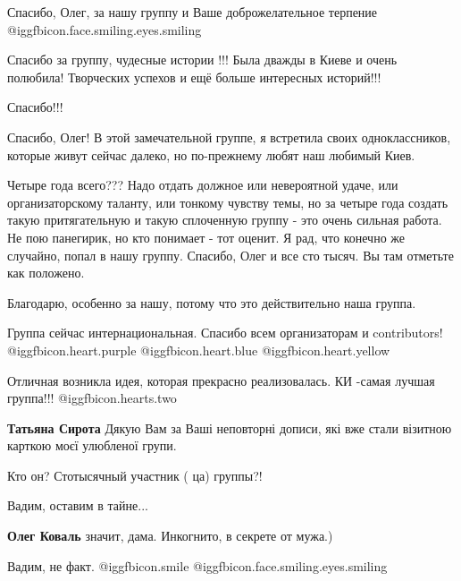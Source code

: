 \begin{itemize}
Спасибо, Олег, за нашу группу и Ваше доброжелательное терпение  @igg{fbicon.face.smiling.eyes.smiling} 

Спасибо за группу, чудесные истории !!! Была дважды в Киеве и очень полюбила!
Творческих успехов и ещё больше интересных историй!!!

Спасибо!!!


Спасибо, Олег! В этой замечательной группе, я встретила своих одноклассников,
которые живут сейчас далеко, но по-прежнему любят наш любимый Киев.


Четыре года всего??? Надо отдать должное или невероятной удаче, или
организаторскому таланту, или тонкому чувству темы, но за четыре года создать
такую притягательную и такую сплоченную группу - это очень сильная работа. Не
пою панегирик, но кто понимает - тот оценит. Я рад, что конечно же случайно,
попал в нашу группу. Спасибо, Олег и все сто тысяч. Вы там отметьте как
положено.

\begin{itemize} %
Благодарю, особенно за нашу, потому что это действительно наша группа.
\end{itemize} %

Группа сейчас интернациональная. Спасибо всем организаторам и contributors!  @igg{fbicon.heart.purple}  @igg{fbicon.heart.blue}  @igg{fbicon.heart.yellow} 


Отличная возникла идея, которая прекрасно реализовалась.
КИ -самая лучшая группа!!! @igg{fbicon.hearts.two} 

\begin{itemize} %
\textbf{Татьяна Сирота} Дякую Вам за Ваші неповторні дописи, які вже стали візитною карткою моєї улюбленої групи.
\end{itemize} %

Кто он? Стотысячный участник ( ца) группы?!

\begin{itemize} %
Вадим, оставим в тайне...

\textbf{Олег Коваль} значит, дама. Инкогнито, в секрете от мужа.)

Вадим, не факт.  @igg{fbicon.smile}  @igg{fbicon.face.smiling.eyes.smiling} 


\end{itemize}
\end{itemize}
